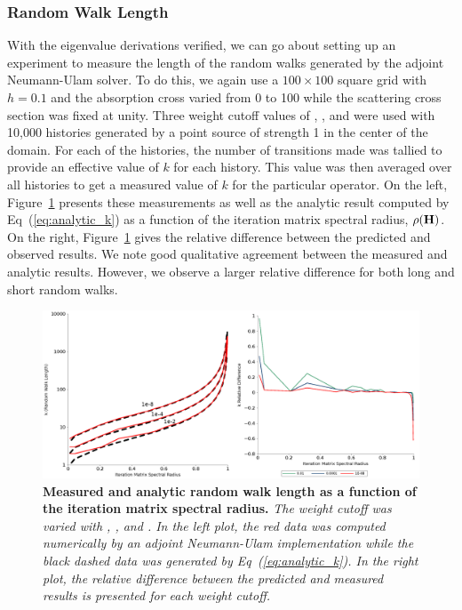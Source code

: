 \subsubsection{Random Walk Length }
\label{subsubsec:walk_length}
With the eigenvalue derivations verified, we can go about setting up
an experiment to measure the length of the random walks generated by
the adjoint Neumann-Ulam solver. To do this, we again use a $100
\times 100$ square grid with $h=0.1$ and the absorption cross varied
from 0 to 100 while the scattering cross section was fixed at
unity. Three weight cutoff values of , , and
 were used with 10,000 histories generated by a point source
of strength 1 in the center of the domain. For each of the histories,
the number of transitions made was tallied to provide an effective
value of $k$ for each history. This value was then averaged over all
histories to get a measured value of $k$ for the particular
operator. On the left, Figure~\ref{fig:measured_length} presents these
measurements as well as the analytic result computed by
Eq~(\ref{eq:analytic_k}) as a function of the iteration matrix
spectral radius, $\rho(\mathbf{H})$. On the right,
Figure~\ref{fig:measured_length} gives the relative difference between the
predicted and observed results. We note good qualitative agreement
between the measured and analytic results. However, we observe a
larger relative difference for both long and short random walks.
\begin{figure}[t!]
  \begin{spacing}{1.0}
    \begin{center}
      \includegraphics[width=6.0in,clip]{chapters/parallel_mc/measured_length_2.pdf}
    \end{center}
    \caption{\textbf{Measured and analytic random walk length as a
        function of the iteration matrix spectral radius.} \textit{The
        weight cutoff was varied with , , and
        . In the left plot, the red data was computed
        numerically by an adjoint Neumann-Ulam implementation while
        the black dashed data was generated by
        Eq~(\ref{eq:analytic_k}). In the right plot, the relative
        difference between the predicted and measured results is
        presented for each weight cutoff.}}
    \label{fig:measured_length}
  \end{spacing}
\end{figure}

